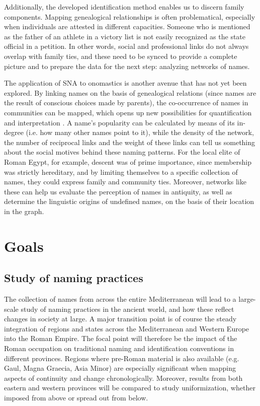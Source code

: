 \documentclass[amsthm,ebook]{saparticle}
\begin{document}
Additionally, the developed identification method enables us to discern family components. Mapping genealogical
relationships is often problematical, especially when individuals are attested in different capacities. Someone who is
mentioned as the father of an athlete in a victory list is not easily recognized as the state official in a petition.
In other words, social and professional links do not always overlap with family ties, and these need to be synced to
provide a complete picture and to prepare the data for the next step: analyzing networks of names.

The application of SNA to onomastics is another avenue that has not yet been explored. By linking names on the basis of
genealogical relations (since names are the result of conscious choices made by parents), the co-occurrence of names in
communities can be mapped, which opens up new possibilities for quantification and interpretation \citep{Broux2015c}. A
name's popularity can be calculated by means of its in-degree (i.e. how many other names point to it), while the
density of the network, the number of reciprocal links and the weight of these links can tell us something about the
social motives behind these naming patterns. For the local elite of Roman Egypt, for example, descent was of prime
importance, since membership was strictly hereditary, and by limiting themselves to a specific collection of names,
they could express family and community ties. Moreover, networks like these can help us evaluate the perception of
names in antiquity, as well as determine the linguistic origins of undefined names, on the basis of their location in
the graph.

\section{Goals}
\subsection{Study of naming practices}


The collection of names from across the entire Mediterranean will lead to a large-scale study of naming practices in the
ancient world, and how these reflect changes in society at large. A major transition point is of course the steady
integration of regions and states across the Mediterranean and Western Europe into the Roman Empire. The focal point
will therefore be the impact of the Roman occupation on traditional naming and identification conventions in different
provinces. Regions where pre-Roman material is also available (e.g. Gaul, Magna Graecia, Asia Minor) are especially
significant when mapping aspects of continuity and change chronologically. Moreover, results from both eastern and
western provinces will be compared to study uniformization, whether imposed from above or spread out from below.
\end{document}
